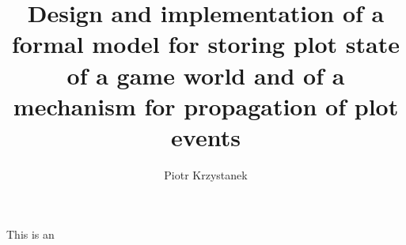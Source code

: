 \documentclass[magister,druk,en]{dyplom}
\author{Piotr Krzystanek}
\title{Design and implementation of a formal model for storing plot state of a game world and of a mechanism for propagation of plot events}
\begin{document}
\maketitle



\tableofcontents







This is an



\listoffigures
\listoflistings
\listoftables

\appendixpage
\appendix

\end{document}
